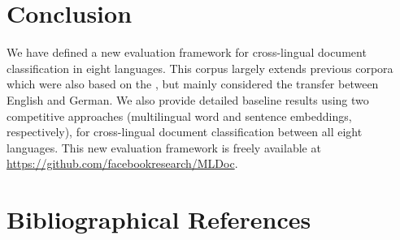 \documentclass[10pt, a4paper]{article}
\begin{document}
\section{Conclusion}

We have defined a new evaluation framework for cross-lingual document classification in eight languages. This corpus largely extends previous corpora which were also based on the \rcv{}, but mainly considered the transfer between English and German.
We also provide detailed baseline results using two competitive approaches (multilingual word and sentence embeddings, respectively), for cross-lingual document classification between all eight languages.
This new evaluation framework is freely available at \url{https://github.com/facebookresearch/MLDoc}.


\section{Bibliographical References}
\small


\end{document}
